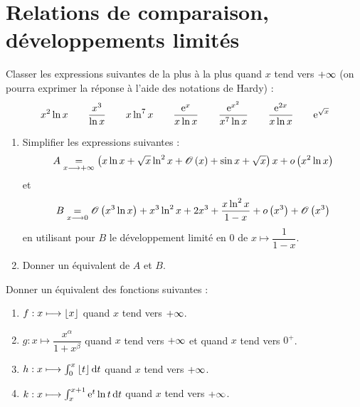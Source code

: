 \chapter{Relations de comparaison, développements limités}

\minitoc

\begin{exo}[Exercice 1]
Classer les expressions suivantes de la plus  à la plus  quand \(x\) tend vers \(+\infty\) (on pourra exprimer la réponse à l'aide des notations de Hardy) : \[x^2\ln x\qquad\dfrac{x^3}{\ln x}\qquad x\ln^7x\qquad\dfrac{\mathrm{e}^{x}}{x\ln x}\qquad\dfrac{\mathrm{e}^{x^2}}{x^7\ln x}\qquad\dfrac{\mathrm{e}^{2x}}{x\ln x}\qquad\mathrm{e}^{\sqrt{x}}\]
\end{exo}

\begin{corr}
\end{corr}

\begin{exo}[Exercice 2]
\begin{enumerate}
\item Simplifier les expressions suivantes : \[A\underset{x\longrightarrow+\infty}{=}\left(x\ln x+\sqrt{x}\ln^2x+\mathscr{O}\left(x\right)+\sin x+\sqrt{x}\right)x+o\left(x^2\ln x\right)\] et \[B\underset{x\longrightarrow0}{=}\mathscr{O}\left(x^3\ln x\right)+x^3\ln^2x+2x^3+\dfrac{x\ln^2x}{1-x}+o\left(x^3\right)+\mathscr{O}\left(x^3\right)\] en utilisant pour \(B\) le développement limité en \(0\) de \(x\mapsto\dfrac{1}{1-x}\). \\

\item Donner un équivalent de \(A\) et \(B\).
\end{enumerate}
\end{exo}

\begin{corr}
\end{corr}

\begin{exo}[Exercice 3]
Donner un équivalent des fonctions suivantes :

\begin{enumerate}
\item \(f:x\longmapsto\left\lfloor x\right\rfloor\) quand \(x\) tend vers \(+\infty\). \\

\item \(g:x\mapsto\dfrac{x^{\alpha}}{1+x^{\beta}}\) quand \(x\) tend vers \(+\infty\) et quand \(x\) tend vers \(0^+\). \\

\item \(h:x\mapsto\int_0^x\floor{t}\odif{t}\) quand \(x\) tend vers \(+\infty\). \\

\item \(k:x\mapsto\int_x^{x+1}\e{t}\ln t\odif{t}\) quand \(x\) tend vers \(+\infty\).
\end{enumerate}
\end{exo}

